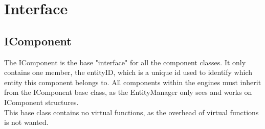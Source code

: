 \section{Interface}
\subsection{IComponent}

The IComponent is the base "interface" for all the component classes. 
It only contains one member, the entityID, which is a unique id used to identify which entity this component belongs to.
All components within the engines must inherit from the IComponent base class, as the EntityManager only sees and works on IComponent structures.\\
This base class contains no virtual functions, as the overhead of virtual functions is not wanted.
